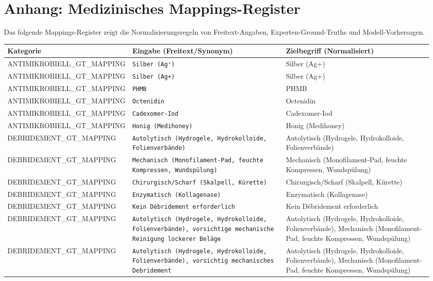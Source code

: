 \section*{Anhang: Medizinisches Mappings-Register}
Das folgende Mappings-Register zeigt die Normalisierungsregeln von Freitext-Angaben, Experten-Ground-Truths und Modell-Vorhersagen.\\[1em]
\begin{longtable}{|p{3.5cm}|p{5cm}|p{6.5cm}|}
\hline
\textbf{Kategorie} & \textbf{Eingabe (Freitext/Synonym)} & \textbf{Zielbegriff (Normalisiert)} \\ \hline
\endhead
ANTIMIKROBIELL\_GT\_MAPPING & \texttt{Silber (Ag⁺)} & Silber (Ag+) \\ \hline
ANTIMIKROBIELL\_GT\_MAPPING & \texttt{Silber (Ag+)} & Silber (Ag+) \\ \hline
ANTIMIKROBIELL\_GT\_MAPPING & \texttt{PHMB} & PHMB \\ \hline
ANTIMIKROBIELL\_GT\_MAPPING & \texttt{Octenidin} & Octenidin \\ \hline
ANTIMIKROBIELL\_GT\_MAPPING & \texttt{Cadexomer-Iod} & Cadexomer-Iod \\ \hline
ANTIMIKROBIELL\_GT\_MAPPING & \texttt{Honig (Medihoney)} & Honig (Medihoney) \\ \hline
DEBRIDEMENT\_GT\_MAPPING & \texttt{Autolytisch (Hydrogele, Hydrokolloide, Folienverbände)} & Autolytisch (Hydrogele, Hydrokolloide, Folienverbände) \\ \hline
DEBRIDEMENT\_GT\_MAPPING & \texttt{Mechanisch (Monofilament-Pad, feuchte Kompressen, Wundspülung)} & Mechanisch (Monofilament-Pad, feuchte Kompressen, Wundspülung) \\ \hline
DEBRIDEMENT\_GT\_MAPPING & \texttt{Chirurgisch/Scharf (Skalpell, Kürette)} & Chirurgisch/Scharf (Skalpell, Kürette) \\ \hline
DEBRIDEMENT\_GT\_MAPPING & \texttt{Enzymatisch (Kollagenase)} & Enzymatisch (Kollagenase) \\ \hline
DEBRIDEMENT\_GT\_MAPPING & \texttt{Kein Débridement erforderlich} & Kein Débridement erforderlich \\ \hline
DEBRIDEMENT\_GT\_MAPPING & \texttt{Autolytisch (Hydrogele, Hydrokolloide, Folienverbände), vorsichtige mechanische Reinigung lockerer Beläge} & Autolytisch (Hydrogele, Hydrokolloide, Folienverbände), Mechanisch (Monofilament-Pad, feuchte Kompressen, Wundspülung) \\ \hline
DEBRIDEMENT\_GT\_MAPPING & \texttt{Autolytisch (Hydrogele, Hydrokolloide, Folienverbände), vorsichtig mechanisches Debridement} & Autolytisch (Hydrogele, Hydrokolloide, Folienverbände), Mechanisch (Monofilament-Pad, feuchte Kompressen, Wundspülung) \\ \hline

\end{longtable}
